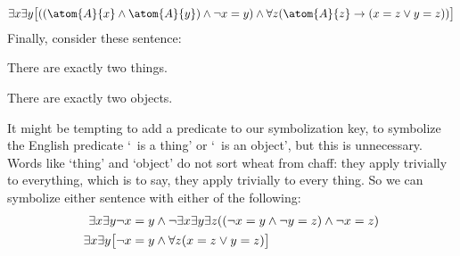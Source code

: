 $$\exists x\exists y\bigl[((\atom{A}{x} \eand \atom{A}{y}) \eand \enot x = y) \eand \forall z(\atom{A}{z} \eif ( x= z \eor y = z))\bigr]$$
Finally, consider these sentence:
\begin{earg}
\item[\ex{exactly2things}] There are exactly two things.
\item[\ex{exactly2objects}] There are exactly two objects.
\end{earg}
It might be tempting to add a predicate to our symbolization key, to symbolize the English predicate `\blank\ is a thing' or `\blank\ is an object', but this is unnecessary. Words like `thing' and `object' do not sort wheat from chaff: they apply trivially to everything, which is to say, they apply trivially to every thing. So we can symbolize either sentence with either of the following:
	\begin{align*}
		\exists x \exists y \neg x = y & \wedge  \neg \exists x \exists y \exists z ((\neg x = y \wedge \neg y = z) \wedge \neg x = z) \\
		\exists x \exists y \bigl[\neg x = y & \wedge \forall z(x=z \vee y = z)\bigr]
	\end{align*}

\practiceproblems


